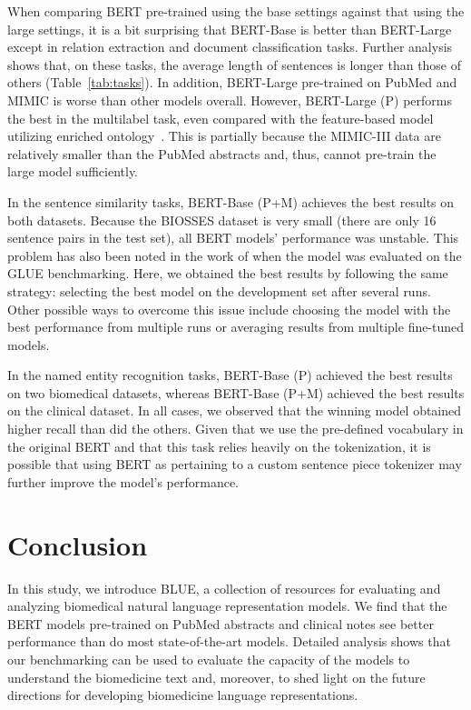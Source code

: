 \documentclass[11pt,a4paper]{article}
\begin{document}
When comparing BERT pre-trained using the base settings against that using the large settings, it is a bit surprising that BERT-Base is better than BERT-Large except in relation extraction and document classification tasks. Further analysis shows that, on these tasks, the average length of sentences is longer than those of others (Table~\ref{tab:tasks}). In addition, BERT-Large pre-trained on PubMed and MIMIC is worse than other models overall. However, BERT-Large (P) performs the best in the multilabel task, even compared with the feature-based model utilizing enriched ontology~\cite{yan2017elucidating}. This is partially because the MIMIC-III data are relatively smaller than the PubMed abstracts and, thus, cannot pre-train the large model sufficiently.

In the sentence similarity tasks, BERT-Base (P+M) achieves the best results on both datasets. Because the BIOSSES dataset is very small (there are only 16 sentence pairs in the test set), all BERT models' performance was unstable. This problem has also been noted in the work of \citet{devlin2018bert} when the model was evaluated on the GLUE benchmarking. Here, we obtained the best results by following the same strategy: selecting the best model on the development set after several runs. Other possible ways to overcome this issue include choosing the model with the best performance from multiple runs or averaging results from multiple fine-tuned models.

In the named entity recognition tasks, BERT-Base (P) achieved the best results on two biomedical datasets, whereas BERT-Base (P+M) achieved the best results on the clinical dataset. In all cases, we observed that the winning model obtained higher recall than did the others. Given that we use the pre-defined vocabulary in the original BERT and that this task relies heavily on the tokenization, it is possible that using BERT as pertaining to a custom sentence piece tokenizer may further improve the model's performance.

\section{Conclusion}

In this study, we introduce BLUE, a collection of resources for evaluating and analyzing biomedical natural language representation models. We find that the BERT models pre-trained on PubMed abstracts and clinical notes see better performance than do most state-of-the-art models. Detailed analysis shows that our benchmarking can be used to evaluate the capacity of the models to understand the biomedicine text and, moreover, to shed light on the future directions for developing biomedicine language representations.
\end{document}
